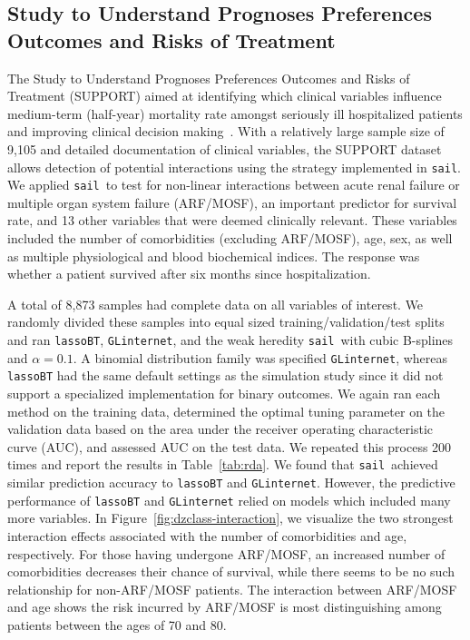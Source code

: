 \documentclass[12pt,letter]{article}\usepackage[]{graphicx}\usepackage[]{color}
\newcommand{\sail}{\texttt{sail}}
\begin{document}
\subsection{Study to Understand Prognoses Preferences Outcomes and Risks of Treatment}

The Study to Understand Prognoses Preferences Outcomes and Risks of Treatment (SUPPORT) aimed at identifying which clinical variables influence medium-term (half-year) mortality rate amongst seriously ill hospitalized patients and improving clinical decision making~\citep{connors1995controlled}. 
With a relatively large sample size of 9,105 and detailed documentation of clinical variables, the SUPPORT dataset allows detection of potential interactions using the strategy implemented in \sail. We applied \sail ~to test for non-linear interactions between acute renal failure or multiple organ system failure (ARF/MOSF), an important predictor for survival rate, and 13 other variables that were deemed clinically relevant. 
These variables included the number of comorbidities (excluding ARF/MOSF), age, sex, as well as multiple physiological and blood biochemical indices. The response was whether a patient survived after six months since hospitalization.

A total of 8,873 samples had complete data on all variables of interest. 
We randomly divided these samples into equal sized training/validation/test splits and ran \texttt{lassoBT}, \texttt{GLinternet}, and the weak heredity \sail ~with cubic B-splines and $\alpha=0.1$. 
A binomial distribution family was specified \texttt{GLinternet}, whereas \texttt{lassoBT} had the same default settings as the simulation study since it did not support a specialized implementation for binary outcomes. 
We again ran each method on the training data, determined the optimal tuning parameter on the validation data based on the area under the receiver operating characteristic curve (AUC), and assessed AUC on the test data. 
We repeated this process 200 times and report the results in Table~\ref{tab:rda}.
We found that \sail ~achieved similar prediction accuracy to \texttt{lassoBT} and \texttt{GLinternet}. However, the predictive performance of \texttt{lassoBT} and \texttt{GLinternet} relied on models which included many more variables. 
In Figure~\ref{fig:dzclass-interaction}, we visualize the two strongest interaction effects associated with the number of comorbidities and age, respectively. 
For those having undergone ARF/MOSF, an increased number of comorbidities decreases their chance of survival, while there seems to be no such relationship for non-ARF/MOSF patients. 
The interaction between ARF/MOSF and age shows the risk incurred by ARF/MOSF is most distinguishing among patients between the ages of 70 and 80.
\end{document}
